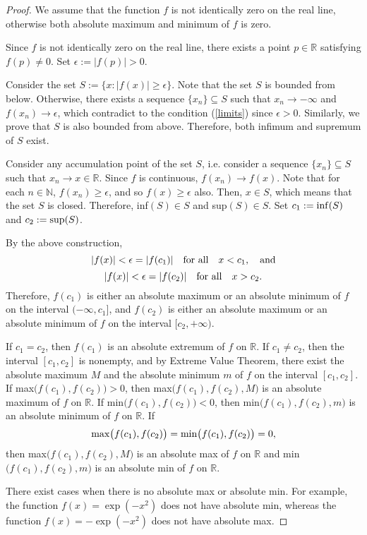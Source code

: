 \documentclass[11pt]{article}
\theoremstyle{plain}
\theoremstyle{remark}
\newcommand {\mbR} {\mathbb R}
\newcommand {\mbN} {\mathbb N}
\begin{document}
\begin{proof}
	
	We assume that the function $f$ is not identically zero on the real line, otherwise both absolute maximum and minimum of $f$ is zero.
	
	Since $f$ is not identically zero on the real line, there exists a point $p \in \mathbb{R}$ satisfying $f(p) \neq 0$. Set $\epsilon:= |f(p)|>0$. 
	
	Consider the set $S:=\{x: |f(x)| \geq \epsilon \}$. Note that the set $S$ is bounded from below. Otherwise, there exists a sequence $\{x_n\} \subseteq S$ such that $x_n \to -\infty$ and $f(x_n) \to \epsilon$, which contradict to the condition (\ref{limits}) since $\epsilon>0$. Similarly, we prove that $S$ is also bounded from above. Therefore, both infimum and supremum of $S$ exist. 
	
	Consider any accumulation point of the set $S$, i.e. consider a sequence 
	$\{x_n\} \subseteq S$ such that $x_n \to x \in \mbR$. Since $f$ is continuous, $f(x_n) \to f(x)$. Note that for each $n \in \mbN$, $f(x_n) \geq \epsilon$, and so $f(x) \geq \epsilon$ also. Then, $x \in S$, which means that the set $S$ is closed. Therefore, inf$(S) \in S$ and sup$(S) \in S$.
	Set $c_1:= {\rm inf}(S)$ and $c_2:= {\rm sup}(S)$.
	
	By the above construction, 
	$$
	|f(x)|<\epsilon = |f(c_1)| \quad {\rm for} \ {\rm all} \quad x<c_1, \quad {\rm and}
	$$
	$$
	|f(x)|<\epsilon = |f(c_2)| \quad {\rm for} \ {\rm all} \quad x>c_2.
	$$
	Therefore, $f(c_1)$ is either an absolute maximum or an absolute minimum of $f$ on the interval $(-\infty, c_1]$, and $f(c_2)$ is either an absolute maximum or an absolute minimum of $f$ on the interval 
	$[c_2, +\infty)$.
	
	If $c_1 = c_2$, then $f(c_1)$ is an absolute extremum of $f$ on $\mbR$. If $c_1 \neq c_2$, then the interval $[c_1,c_2]$ is nonempty, and by Extreme Value Theorem, there exist the absolute maximum $M$ and the absolute minimum $m$ of $f$ on the interval $[c_1, c_2]$. 
	If max$\big(f(c_1),f(c_2)\big)>0$, then max$\big(f(c_1),f(c_2), M\big)$ is an absolute maximum of $f$ on $\mbR$. If min$\big(f(c_1),f(c_2)\big)<0$, then min$\big(f(c_1),f(c_2), m\big)$ is an absolute minimum of $f$ on $\mbR$. If 
	$$
	{\rm max} \big(f(c_1),f(c_2)\big)= {\rm min} \big(f(c_1),f(c_2)\big)=0,
	$$ then max$\big(f(c_1),f(c_2), M\big)$ is an absolute max of $f$ on $\mbR$ and min$\big(f(c_1),f(c_2), m\big)$ is an absolute min of $f$ on $\mbR$.
	
	There exist cases when there is no absolute max or absolute min. For example, the function $f(x) = \exp(-x^2)$ does not have absolute min, whereas the function $f(x) = -\exp(-x^2)$ does not have absolute max.

\end{proof}
\end{document}
